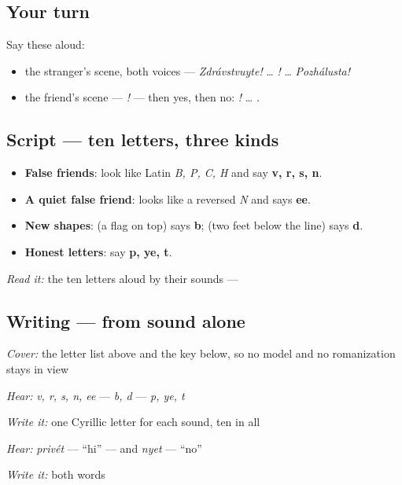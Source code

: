 \subsection*{Your turn}
Say these aloud:

\begin{itemize}
\raggedright
  \item the stranger's scene, both voices — \emph{Zdrávstvuyte!} … \emph{!} … \emph{Pozhálusta!}
  \item the friend's scene — \emph{!} — then yes, then no: \emph{!} … \emph{.}
\end{itemize}

\subsection*{Script — ten letters, three kinds}
\begin{itemize}
\raggedright
  \item \textbf{False friends}: \textbf{   } look like Latin \emph{B, P, C, H} and say \textbf{v, r, s, n}.
  \item \textbf{A quiet false friend}: \textbf{} looks like a reversed \emph{N} and says \textbf{ee}.
  \item \textbf{New shapes}: \textbf{} (a flag on top) says \textbf{b}; \textbf{} (two feet below the line) says \textbf{d}.
  \item \textbf{Honest letters}: \textbf{  } say \textbf{p, ye, t}.
\end{itemize}

\emph{Read it:} the ten letters aloud by their sounds —          

\subsection*{Writing — from sound alone}
\emph{Cover:} the letter list above and the key below, so no model and no romanization stays in view

\emph{Hear:} \emph{v, r, s, n, ee} — \emph{b, d} — \emph{p, ye, t}

\emph{Write it:} one Cyrillic letter for each sound, ten in all

\emph{Hear:} \emph{privét} — \textquotedblleft{}hi\textquotedblright{} — and \emph{nyet} — \textquotedblleft{}no\textquotedblright{}

\emph{Write it:} both words

